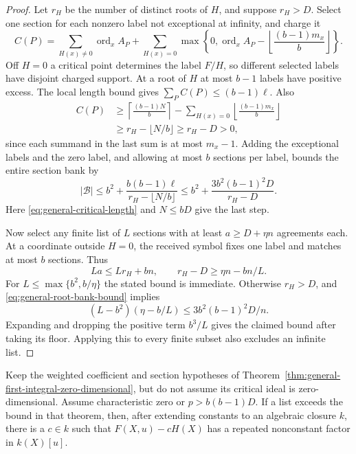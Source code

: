 \begin{proof}
Let $r_H$ be the number of distinct roots of $H$, and suppose $r_H>D$.
Select one section for each nonzero label not exceptional at infinity,
and charge it
\[
 C(P)=\sum_{H(x)\ne0}\operatorname{ord}_x A_P+
 \sum_{H(x)=0}\max\left\{0,\operatorname{ord}_x A_P
                    -\left\lfloor\frac{(b-1)m_x}{b}\right\rfloor\right\}.
\]
Off $H=0$ a critical point determines the label $F/H$, so different
selected labels have disjoint charged support.  At a root of $H$ at
most $b-1$ labels have positive excess.  The local length bound gives
$\sum_P C(P)\le(b-1)\ell$.  Also
\begin{align*}
 C(P)&\ge\left\lceil\frac{(b-1)N}{b}\right\rceil
       -\sum_{H(x)=0}\left\lfloor\frac{(b-1)m_x}{b}\right\rfloor\\
 &\ge r_H-\lfloor N/b\rfloor\ge r_H-D>0,
\end{align*}
since each summand in the last sum is at most $m_x-1$.
Adding the exceptional labels and the zero label, and allowing at most
$b$ sections per label, bounds the entire section bank by
\begin{equation}\label{eq:general-root-bank-bound}
 |\mathcal B|\le b^2+
 \frac{b(b-1)\ell}{r_H-\lfloor N/b\rfloor}
 \le b^2+\frac{3b^2(b-1)^2D}{r_H-D}.
\end{equation}
Here \eqref{eq:general-critical-length} and $N\le bD$ give the last step.

Now select any finite list of $L$ sections with at least
$a\ge D+\eta n$ agreements each.  At a coordinate outside $H=0$,
the received symbol fixes one label and matches at most $b$ sections.
Thus
\[
 La\le Lr_H+bn,\qquad r_H-D\ge\eta n-bn/L.
\]
For $L\le\max\{b^2,b/\eta\}$ the stated bound is immediate.
Otherwise $r_H>D$, and \eqref{eq:general-root-bank-bound} implies
\[
 (L-b^2)(\eta-b/L)\le3b^2(b-1)^2D/n.
\]
Expanding and dropping the positive term $b^3/L$ gives the claimed
bound after taking its floor.  Applying this to every finite subset
also excludes an infinite list.
\end{proof}

\begin{corollary}\label{cor:general-first-integral-repeated-fiber}
Keep the weighted coefficient and section hypotheses of
Theorem~\ref{thm:general-first-integral-zero-dimensional}, but do not
assume its critical ideal is zero-dimensional.  Assume characteristic
zero or $p>b(b-1)D$.  If a list exceeds the bound in that theorem, then,
after extending constants to an algebraic closure $k$, there is a
$c\in k$ such that $F(X,u)-cH(X)$ has a repeated nonconstant factor
in $k(X)[u]$.
\end{corollary}

